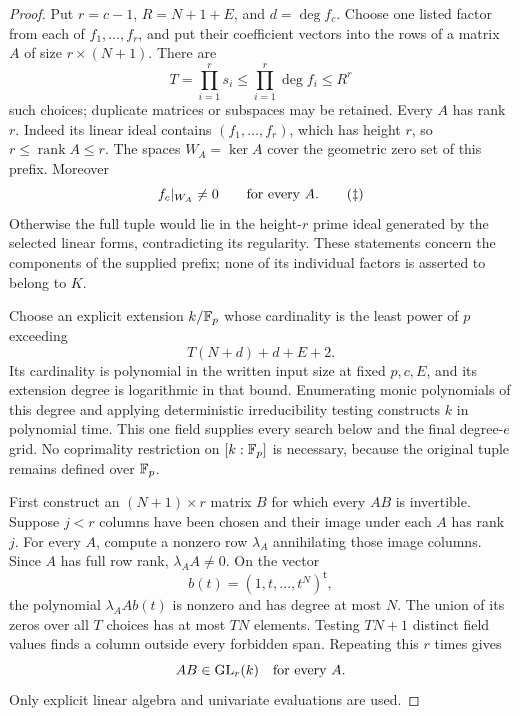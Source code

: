 \begin{proof}
Put \(r=c-1\), \(R=N+1+E\), and \(d=\deg f_c\). Choose one
listed factor from each of \(f_1,\ldots,f_r\), and put their coefficient
vectors into the rows of a matrix \(A\) of size \(r\times(N+1)\).
There are
\[
 T=\prod_{i=1}^r s_i\leq\prod_{i=1}^r\deg f_i\leq R^r
\]
such choices; duplicate matrices or subspaces may be retained.
Every \(A\) has rank \(r\). Indeed its linear ideal contains
\((f_1,\ldots,f_r)\), which has height \(r\), so
\(r\leq\operatorname{rank}A\leq r\).
The spaces \(W_A=\ker A\) cover the geometric zero set of this prefix.
Moreover
\[
 f_c|_{W_A}\ne0\qquad\hbox{for every }A.
 \tag{\(\ddagger\)}
\]
Otherwise the full tuple would lie in the height-\(r\) prime ideal
generated by the selected linear forms, contradicting its regularity.
These statements concern the components of the supplied prefix; none
of its individual factors is asserted to belong to \(K\).

Choose an explicit extension \(k/\mathbb F_p\) whose cardinality is the least
power of \(p\) exceeding
\[
 T(N+d)+d+E+2.
\]
Its cardinality is polynomial in the written input size at fixed
\(p,c,E\), and its extension degree is logarithmic in that bound.
Enumerating monic polynomials of this degree and applying deterministic
irreducibility testing constructs \(k\) in polynomial time. This one
field supplies every search below and the final degree-\(e\) grid.
No coprimality restriction on \([k:\mathbb F_p]\) is necessary, because the
original tuple remains defined over \(\mathbb F_p\).

First construct an \((N+1)\times r\) matrix \(B\) for which every
\(AB\) is invertible. Suppose \(j<r\) columns have been chosen and
their image under each \(A\) has rank \(j\). For every \(A\),
compute a nonzero row \(\lambda_A\) annihilating those image columns.
Since \(A\) has full row rank, \(\lambda_AA\ne0\). On the vector
\[
 b(t)=(1,t,\ldots,t^N)^{\mathsf t},
\]
the polynomial \(\lambda_A A b(t)\) is nonzero and has degree at most
\(N\). The union of its zeros over all \(T\) choices has at most
\(TN\) elements. Testing \(TN+1\) distinct field values finds a
column outside every forbidden span. Repeating this \(r\) times gives
\[
 AB\in\operatorname{GL}_r(k)\quad\hbox{for every }A.
\]
Only explicit linear algebra and univariate evaluations are used.


\end{proof}
